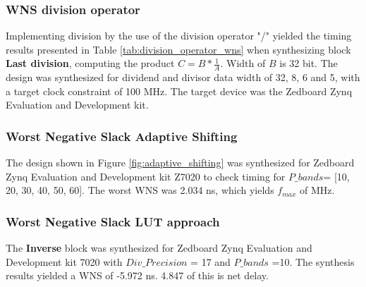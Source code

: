 \subsubsection{WNS division operator}
Implementing division by the use of the division operator "/" yielded the timing results presented in Table \ref{tab:division_operator_wns} when synthesizing block \textbf{Last division}, computing the product $C= B*\frac{1}{A}$. Width of $B$ is 32 bit. The design was synthesized for dividend and divisor data width of 32, 8, 6 and 5, with a target clock constraint of 100 MHz. The target device was the Zedboard Zynq Evaluation and Development kit. 
\begin{table}[H]
    \centering
    \caption{Synthesis results for ZedBoard Zynq Evaluation and Development Kit for \textbf{Last division} using division operator "/".}
    \label{tab:division_operator_wns}
\end{table}
\subsubsection{Worst Negative Slack Adaptive Shifting}
 The design shown in Figure \ref{fig:adaptive_shifting} was synthesized for Zedboard Zynq Evaluation and Development kit Z7020 to check timing for $P\_bands$= [10, 20, 30, 40, 50, 60]. The worst WNS was 2.034 ns, which yields $f_{max}$ of  MHz. 
 
 
 
 \subsubsection{Worst Negative Slack LUT approach}
 The \textbf{Inverse} block was synthesized for Zedboard Zynq Evaluation and Development kit 7020 with $Div\_Precision$ = 17 and $P\_bands$ =10. The synthesis results yielded a WNS of -5.972 ns. 4.847 of this is net delay. \\
 
